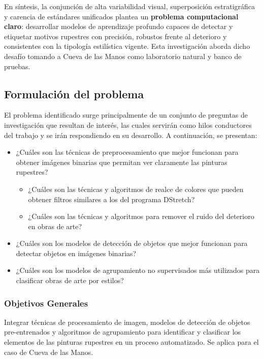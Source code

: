 En síntesis, la conjunción de alta variabilidad visual, superposición estratigráfica y carencia de estándares unificados plantea un \textbf{problema computacional claro}: desarrollar modelos de aprendizaje profundo capaces de detectar y etiquetar motivos rupestres con precisión, robustos frente al deterioro y consistentes con la tipología estilística vigente.
Esta investigación aborda dicho desafío tomando a Cueva de las Manos como laboratorio natural y banco de pruebas.

\subsection{Formulación del problema}

El problema identificado surge principalmente de un conjunto de preguntas de investigación que resultan de interés, las cuales servirán como hilos conductores del trabajo y se irán respondiendo en su desarrollo.
A continuación, se presentan:

\begin{itemize}
    \item ¿Cuáles son las técnicas de preprocesamiento que mejor funcionan para obtener imágenes binarias que permitan ver claramente las pinturas rupestres?
    \begin{itemize}
        \item ¿Cuáles son las técnicas y algoritmos de realce de colores que pueden obtener filtros similares a los del programa DStretch?
        \item ¿Cuáles son las técnicas y algoritmos para remover el ruido del deterioro en obras de arte?
    \end{itemize}
    \item ¿Cuáles son los modelos de detección de objetos que mejor funcionan para detectar objetos en imágenes binarias?
    \item ¿Cuáles son los modelos de agrupamiento no supervisados más utilizados para clasificar obras de arte por estilos?
\end{itemize}

\subsubsection{Objetivos Generales}

Integrar técnicas de procesamiento de imagen, modelos de detección de objetos pre-entrenados y algoritmos de agrupamiento para identificar y clasificar los elementos de las pinturas rupestres en un proceso automatizado.
Se aplica para el caso de Cueva de las Manos.

